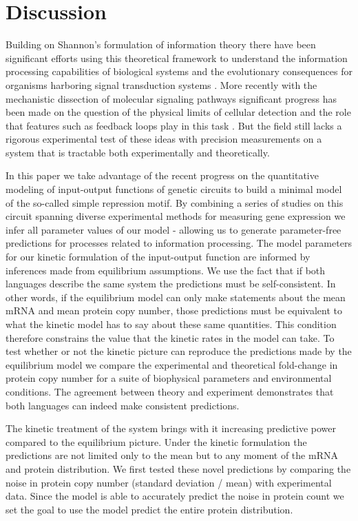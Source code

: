 \section*{Discussion}

Building on Shannon's formulation of information theory there have been
significant efforts using this theoretical framework to understand the
information processing capabilities of biological systems and the evolutionary
consequences for organisms harboring signal transduction systems
\cite{Bergstrom2004, Taylor2007a, Tkacik2008, Polani2009, Nemenman2010,
Rivoire2011}. More recently with the mechanistic dissection of molecular
signaling pathways significant progress has been made on the question of the
physical limits of cellular detection and the role that features such as
feedback loops play in this task \cite{Bialek2005, Libby2007, Tkacik2011,
Rhee2012a, Voliotis2014a}. But the field still lacks a rigorous experimental
test of these ideas with precision measurements on a system that is tractable
both experimentally and theoretically.

In this paper we take advantage of the recent progress on the quantitative
modeling of input-output functions of genetic circuits to build a minimal model
of the so-called simple repression motif. By combining a series of studies on
this circuit spanning diverse experimental methods for measuring gene expression
we infer all parameter values of our model - allowing us to generate
parameter-free predictions for processes related to information processing. The
model parameters for our kinetic formulation of the input-output function are
informed by inferences made from equilibrium assumptions. We use the fact that
if both languages describe the same system the predictions must be
self-consistent. In other words, if the equilibrium model can only make
statements about the mean mRNA and mean protein copy number, those predictions
must be equivalent to what the kinetic model has to say about these same
quantities. This condition therefore constrains the value that the kinetic rates
in the model can take. To test whether or not the kinetic picture can reproduce
the predictions made by the equilibrium model we compare the experimental and
theoretical fold-change in protein copy number for a suite of biophysical
parameters and environmental conditions. The agreement between theory and
experiment demonstrates that both languages can indeed make consistent
predictions.

The kinetic treatment of the system brings with it increasing predictive power
compared to the equilibrium picture. Under the kinetic formulation the
predictions are not limited only to the mean but to any moment of the mRNA and
protein distribution. We first tested these novel predictions by comparing the
noise in protein copy number (standard deviation / mean) with experimental data.
Since the model is able to accurately predict the noise in protein count we set
the goal to use the model predict the entire protein distribution.

